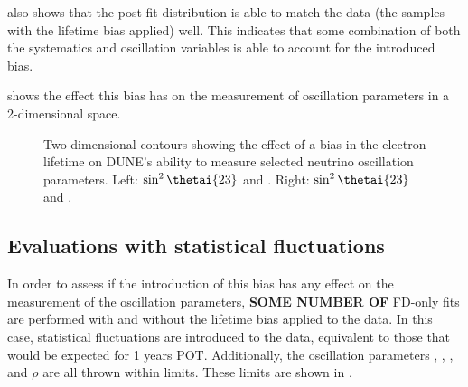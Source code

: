  also shows that the post fit distribution is able to match the data (the samples with the lifetime bias applied) well. 
This indicates that some combination of both the systematics and oscillation variables is able to account for the introduced bias.

 shows the effect this bias has on the measurement of oscillation parameters in a 2-dimensional space.

\begin{figure}[h]
	\begin{minipage}[t]{.5\linewidth}
		\begin{adjustbox}{max totalsize=\linewidth, center}
			
		\end{adjustbox}
	\end{minipage}
	\hfill
	\begin{minipage}[t]{.5\linewidth}
		\begin{adjustbox}{max totalsize=\linewidth, center}
			
		\end{adjustbox}
	\end{minipage}
	\caption[2D contours showing the effect of an electron lifetime bias on the measurement of neutrino oscillation parameters]{Two dimensional contours showing the effect of a bias in the electron lifetime on DUNE's ability to measure selected neutrino oscillation parameters. Left: $\sin^{2}\thetai{23}$ and . Right: $\sin^{2}\thetai{23}$ and \dcp. }
	\label{fig:2dContoursHighStats}
\end{figure}

\subsection{Evaluations with statistical fluctuations}
\label{sec:pdune_calibration:osc:fluctuations}

In order to assess if the introduction of this bias has any effect on the measurement of the oscillation parameters, \textbf{SOME NUMBER OF} FD-only fits are performed with and without the lifetime bias applied to the data.
In this case, statistical fluctuations are introduced to the data, equivalent to those that would be expected for 1 years POT.
Additionally, the oscillation parameters , , , \dcp and $\rho$ are all thrown within limits. 
These limits are shown in .

